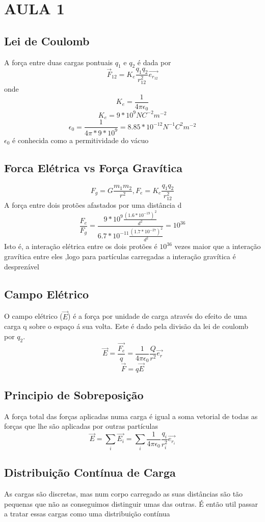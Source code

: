 \documentclass[a4paper]{article}
\begin{document}
 

\section{AULA 1}

\subsection{Lei de Coulomb}
A força entre duas cargas pontuais $q_{1}$ e $q_{2}$ é dada por
\[ \vec{F}_{12} = K_e \frac{q_1 q_2}{r_{12}^2} \vec{e_{r_{12}}}\] 
onde 
\[K_e=\frac{1}{4\pi\epsilon_0} \]
\[ K_e =9*10^9 NC^{-2}m^{-2} \]
\[ \epsilon_0 = \frac{1}{4\pi*9*10^9} = 8.85*10^{-12} N^{-1}C^2m^{-2}\]
$\epsilon_0$ é conhecida como a permitividade do vácuo

\subsection{Forca Elétrica vs Força Gravítica}
\[F_g = G \frac{m_1m_2}{r^2},     F_e = K_e \frac{q_1 q_2}{r_{12}^2}\]
A força entre dois protões afastados por uma distância d
\[\frac{F_e}{F_g}= \frac{9*10^9 \frac{{(1.6*10^{-19})}^2}{d^2}}{6.7*10^{-11} \frac{{(1.7*10^{-27})}^2}{d^2}} = 10^{36}\] 
Isto é, a interação elétrica entre os dois protões é $10^{36}$ vezes maior que a interação gravítica entre eles
,logo para partículas carregadas a interação gravítica é desprezável

\subsection{Campo Elétrico}
O campo elétrico ($\vec{E}$) é a força por unidade de carga através do 
efeito de uma carga q sobre o espaço á sua volta.
Este é dado pela divisão da lei de coulomb por $q_2$.
\[\vec{E} = \frac{\vec{F_e}}{q} = \frac{1}{4\pi\epsilon_0} \frac{Q}{r^2}\vec{e_r}\]
\[\vec{F}= q\vec{E}\]

\subsection{Principio de Sobreposição}
A força total das forças aplicadas numa carga é igual a soma vetorial 
de todas as forças que lhe são aplicadas por outras partículas
\[ \vec{E} = \sum_{i}^{}\vec{E_i} = \sum_{i}^{} \frac{1}{4\pi\epsilon_0} \frac{q_i}{r_i^2} \vec{e_{r_i}} \]

\subsection{Distribuição Contínua de Carga}
As cargas são discretas, mas num corpo carregado as suas distâncias são tão pequenas que não as conseguimos distinguir umas das outras.
É então util passar a tratar essas cargas como uma distribuição contínua
\end{document}
